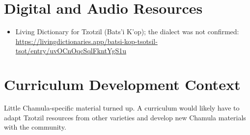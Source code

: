 \documentclass[12pt]{article}
\begin{document}
\section{Digital and Audio Resources}
\begin{itemize}
\item Living Dictionary for Tzotzil (Bats'i K'op); the dialect was not confirmed: \url{https://livingdictionaries.app/batsi-kop-tsotsil-tsot/entry/uvOCnOqcSqlFkntYgS1u}
\end{itemize}

\section{Curriculum Development Context}
Little Chamula-specific material turned up. A curriculum would likely have to adapt Tzotzil resources from other varieties and develop new Chamula materials with the community.
\end{document}
